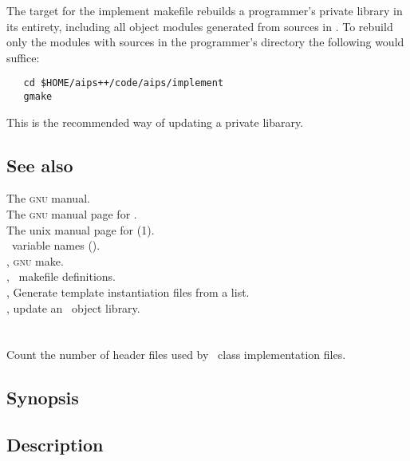 The  target for the implement makefile rebuilds a programmer's
private library in its entirety, including all object modules generated from
sources in .  To rebuild only the modules with sources in the
programmer's directory the following would suffice:

\begin{verbatim}
   cd $HOME/aips++/code/aips/implement
   gmake
\end{verbatim}

\noindent
This is the recommended way of updating a private libarary.

\subsection*{See also}

The \textsc{gnu}  manual.\\
The \textsc{gnu} manual page for .\\
The unix manual page for (1).\\
\aipspp\ variable names ().\\
, \textsc{gnu} make.\\
, \aipspp\ makefile definitions.\\
, Generate template instantiation files from a list.\\
, update an \aipspp\ object library.

 
\newpage
\section{}
\label{depstat}
 
Count the number of header files used by \aipspp\ class implementation files.
 
\subsection*{Synopsis}
 
\begin{synopsis}
\end{synopsis}
 
\subsection*{Description}
 
